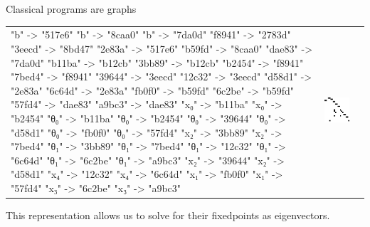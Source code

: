 \documentclass{beamer}
\begin{document}
\begin{frame}[fragile]{Classical programs are graphs}
\begin{table}[H]
\begin{tabular}{lcc}
\begin{adjustbox}{minipage={.25\textwidth}, height=0.14\textwidth, margin*=0cm 0cm 0cm 0.1cm}
{            "b" -> "517e6"
            "b" -> "8caa0"
            "b" -> "7da0d"
            "f8941" -> "2783d"
            "3eecd" -> "8bd47"
            "2e83a" -> "517e6"
            "b59fd" -> "8caa0"
            "dae83" -> "7da0d"
            "b11ba" -> "b12cb"
            "3bb89" -> "b12cb"
            "b2454" -> "f8941"
            "7bed4" -> "f8941"
            "39644" -> "3eecd"
            "12c32" -> "3eecd"
            "d58d1" -> "2e83a"
            "6c64d" -> "2e83a"
            "fb0f0" -> "b59fd"
            "6c2be" -> "b59fd"
            "57fd4" -> "dae83"
            "a9bc3" -> "dae83"
            "x₀" -> "b11ba"
            "x₀" -> "b2454"
            "θ₀" -> "b11ba"
            "θ₀" -> "b2454"
            "θ₀" -> "39644"
            "θ₀" -> "d58d1"
            "θ₀" -> "fb0f0"
            "θ₀" -> "57fd4"
            "x₂" -> "3bb89"
            "x₂" -> "7bed4"
            "θ₁" -> "3bb89"
            "θ₁" -> "7bed4"
            "θ₁" -> "12c32"
            "θ₁" -> "6c64d"
            "θ₁" -> "6c2be"
            "θ₁" -> "a9bc3"
            "x₂" -> "39644"
            "x₂" -> "d58d1"
            "x₄" -> "12c32"
            "x₄" -> "6c64d"
            "x₁" -> "fb0f0"
            "x₁" -> "57fd4"
            "x₃" -> "6c2be"
            "x₃" -> "a9bc3"
          }
      \end{adjustbox} &
      \begin{adjustbox}{minipage={.15\textwidth}, height=0.14\textwidth, margin*=-0.2cm 0cm 0cm 0.5cm}
        \includegraphics[scale=0.15]{../figures/adj_prog.png}
      \end{adjustbox}
    \end{tabular}
  \end{table}
  This representation allows us to solve for their fixedpoints as eigenvectors.
\end{frame}
\end{document}
